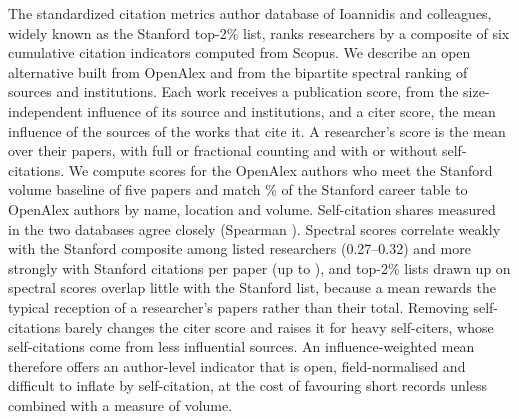 The standardized citation metrics author database of Ioannidis and colleagues, widely known as the Stanford top-2\% list, ranks researchers by a composite of six cumulative citation indicators computed from Scopus. We describe an open alternative built from OpenAlex and from the bipartite spectral ranking of sources and institutions. Each work receives a publication score, from the size-independent influence of its source and institutions, and a citer score, the mean influence of the sources of the works that cite it. A researcher's score is the mean over their papers, with full or fractional counting and with or without self-citations. We compute scores for the \NOaEligible{} OpenAlex authors who meet the Stanford volume baseline of five papers and match \NMatchCareerPct{}\% of the Stanford career table to OpenAlex authors by name, location and volume. Self-citation shares measured in the two databases agree closely (Spearman \NSelfRho{}). Spectral scores correlate weakly with the Stanford composite among listed researchers (0.27--0.32) and more strongly with Stanford citations per paper (up to \NRhoPubfracNcpp{}), and top-2\% lists drawn up on spectral scores overlap little with the Stanford list, because a mean rewards the typical reception of a researcher's papers rather than their total. Removing self-citations barely changes the citer score and raises it for heavy self-citers, whose self-citations come from less influential sources. An influence-weighted mean therefore offers an author-level indicator that is open, field-normalised and difficult to inflate by self-citation, at the cost of favouring short records unless combined with a measure of volume.
